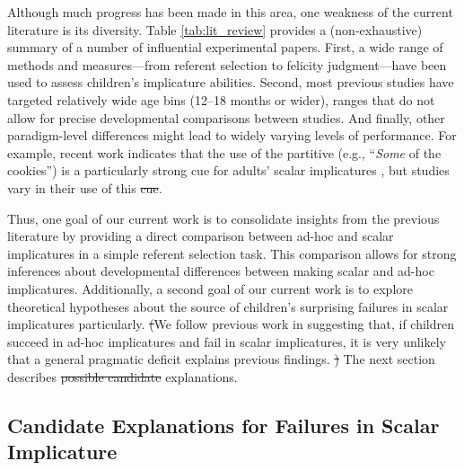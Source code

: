 \documentclass[man]{apa2}
\providecommand{\DIFadd}[1]{{\protect\color{blue}\uwave{#1}}} %
\providecommand{\DIFdel}[1]{{\protect\color{red}\sout{#1}}}                      %
\providecommand{\DIFaddbegin}{} %
\providecommand{\DIFaddend}{} %
\providecommand{\DIFdelbegin}{} %
\providecommand{\DIFdelend}{} %
\begin{document}
Although much progress has been made in this area, one weakness of the current literature is its diversity. Table \ref{tab:lit_review} provides a (non-exhaustive) summary of a number of influential experimental papers. First, a wide range of methods and measures---from referent selection to felicity judgment---have been used to assess children's implicature abilities. Second, most previous studies have targeted relatively wide age bins (12--18 months or wider), ranges that do not allow for precise developmental comparisons between studies. And finally, other paradigm-level differences might lead to widely varying levels of performance. For example, recent work indicates that the use of the partitive (e.g., ``\emph{Some} of the cookies'') is a particularly strong cue for adults' scalar implicatures \cite{degen2015b}, but studies vary in their use of this \DIFdelbegin \DIFdel{cue}\DIFdelend \DIFaddbegin \DIFadd{construction}\DIFaddend .

Thus, one goal of our current work is to consolidate insights from the previous literature by providing a direct comparison between ad-hoc and scalar implicatures in a simple referent selection task. This comparison allows for strong inferences about developmental differences between making scalar and ad-hoc implicatures. Additionally, a second goal of our current work is to explore theoretical hypotheses about the source of children's surprising failures in scalar implicatures particularly. \DIFdelbegin \DIFdel{(}\DIFdelend We follow previous work in suggesting that, if children succeed in ad-hoc implicatures and fail in scalar implicatures, it is very unlikely that a general pragmatic deficit explains previous findings. \DIFdelbegin \DIFdel{) }\DIFdelend The next section describes \DIFdelbegin \DIFdel{possible candidate }\DIFdelend \DIFaddbegin \DIFadd{other possible }\DIFaddend explanations.

\subsection{Candidate Explanations for Failures in Scalar Implicature}
\end{document}
